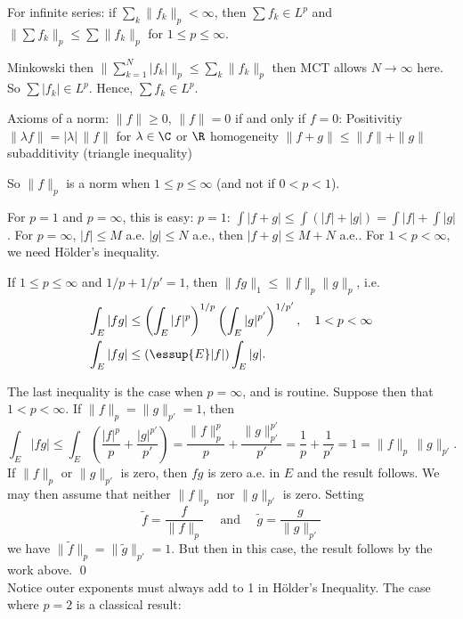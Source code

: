 For infinite series: if $\sum_k \|f_k\|_p < \infty$, then $\sum f_k \in L^p$ and $\| \sum f_k \|_p \leq \sum \|f_k\|_p$ for $1 \leq p \leq \infty$. 

\pf Minkowski then $\| \sum_{k=1}^N |f_k|\|_p \leq \sum_k \|f_k\|_p$ then MCT allows $N \to \infty$ here. So $\sum |f_k| \in L^p$. Hence, $\sum f_k \in L^p$.




Axioms of a norm: 
$\|f\| \geq 0$, $\|f\|=0$ if and only if $f=0$: Positivitiy
$\|\lambda f\|= |\lambda| \, \|f\|$ for $\lambda \in \C$ or $\R$ homogeneity
$\|f+g\| \leq \|f\|+\|g\|$ subadditivity (triangle inequality)

So $\|f\|_p$ is a norm when $1 \leq p \leq \infty$ (and not if $0<p<1$). 

For $p=1$ and $p= \infty$, this is easy: $p=1$: $\int |f+g| \leq \int (|f|+|g|)= \int |f|+ \int |g|$. For $p=\infty$, $|f| \leq M$ a.e. $|g| \leq N$ a.e., then $|f+g| \leq M+N$ a.e.. For $1<p<\infty$, we need H\"older's inequality. 







\begin{thm}
If $1 \leq p \leq \infty$ and $1/p+1/p'=1$, then $\|fg\|_1 \leq \|f\|_p \|g\|_p$, i.e.
	\[
	\begin{split}
	\int_E |fg| &\leq \left( \int_E |f|^p \right)^{1/p} \left( \int_E |g|^{p'} \right)^{1/p'}, \quad 1 < p < \infty \\
	\int_E |fg| &\leq (\essup{E} |f| ) \int_E |g|. 
	\end{split}
	\]
\end{thm}

\pf The last inequality is the case when $p= \infty$, and is routine. Suppose then that $1<p<\infty$. If $\|f\|_p= \|g\|_{p'}=1$, then
	\[
	\int_E |fg| \leq \int_E \left( \dfrac{|f|^p}{p} + \dfrac{|g|^{p'}}{p'} \right)= \dfrac{\|f\|_p^p}{p} + \dfrac{\|g\|^{p'}_{p'}}{p'}= \dfrac{1}{p} + \dfrac{1}{p'}= 1 = \|f\|_p \, \|g\|_{p'}.
	\]
If $\|f\|_p$ or $\|g\|_{p'}$ is zero, then $fg$ is zero a.e. in $E$ and the result follows. We may then assume that neither $\|f\|_p$ nor $\|g\|_{p'}$ is zero. Setting 
	\[
	\widetilde{f}= \dfrac{f}{\|f\|_p} \quad \text{ and } \quad \widetilde{g}= \dfrac{g}{\|g\|_{p'}}
	\]
we have $\|\widetilde{f}\|_p=\|\widetilde{g}\|_{p'}=1$. But then in this case, the result follows by the work above. \qed \\


Notice outer exponents must always add to 1 in H\"older's Inequality. The case where $p=2$ is a classical result:

